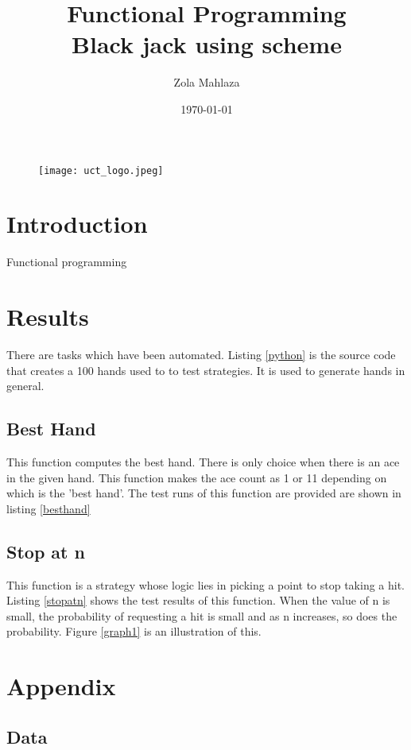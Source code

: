 \documentclass[11pt]{article}
\author{Zola Mahlaza}
\title{\textbf{Functional Programming} \\ Black jack using scheme}
\date{\today}
\begin{document}
	\begin{figure}
	\centering
	\texttt{[image: uct\_logo.jpeg]}
	\end{figure}
	\maketitle
	
	\section{Introduction}
	Functional programming
	\section{Results}
	There are tasks which have been automated. Listing \ref{python} is the source code that creates a 100 hands used to to test strategies. It is used to generate hands in general.
	
	\subsection{Best Hand}
	This function computes the best hand. There is only choice when there
	is an ace in the given hand. This function makes the ace count as 1 or
	11 depending on which is the 'best hand'. The test runs of this function are provided are shown in listing \ref{besthand}
	
	\subsection{Stop at n}
	This function is a strategy whose logic lies in picking a point
	to stop taking a hit. Listing \ref{stopatn} shows the test results of 
	this function. When the value of n is small, the probability of requesting a hit is small and as n increases, so does the probability. Figure \ref{graph1} is an illustration of this.
	\section{Appendix}
	
		\subsection{Data}
		
\end{document}
